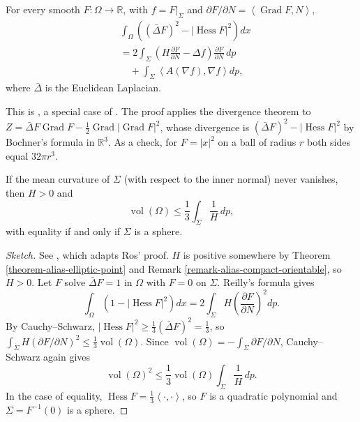 \begin{theorem}
\label{theorem-alias-reilly-formula}
For every smooth
$F:\Omega\to\mathbb{R}$, with
$f=F|_\Sigma$ and
$\partial F/\partial N=\left\langle{}
\operatorname{Grad}F,N\right\rangle{}$,
$$
\begin{aligned}
&\int_\Omega\left((\bar{\Delta}F)^2
-|\operatorname{Hess}F|^2\right)dx\\
&=2\int_\Sigma\left(H
\frac{\partial F}{\partial N}
-\Delta f\right)
\frac{\partial F}{\partial N}\,dp\\
&\quad+\int_\Sigma\left\langle{}
A(\nabla f),\nabla f\right\rangle{}dp,
\end{aligned}
$$
where $\bar{\Delta}$ is the Euclidean
Laplacian.
\end{theorem}

This is \cite[Theorem 4.5,
pp.~35--37]{alias2006analisis}, a special
case of \cite{reilly1977applications}. The
proof applies the divergence theorem to
$Z=\bar{\Delta}F\operatorname{Grad}F
-\frac{1}{2}\operatorname{Grad}
|\operatorname{Grad}F|^2$, whose
divergence is
$(\bar{\Delta}F)^2-|\operatorname{Hess}F|^2$
by Bochner's formula in $\mathbb{R}^3$. As
a check, for $F=|x|^2$ on a ball of radius
$r$ both sides equal $32\pi r^3$.

\begin{theorem}
\label{theorem-alias-heintze-karcher-ros}
If the mean curvature of $\Sigma$ (with
respect to the inner normal) never
vanishes, then $H>0$ and
$$
\operatorname{vol}(\Omega)\leq
\frac{1}{3}\int_\Sigma\frac{1}{H}\,dp,
$$
with equality if and only if $\Sigma$ is a
sphere.
\end{theorem}

\begin{proof}[Sketch]
See \cite[Theorem 4.8,
pp.~40--42]{alias2006analisis}, which
adapts Ros' proof. $H$ is positive
somewhere by Theorem
\ref{theorem-alias-elliptic-point} and
Remark
\ref{remark-alias-compact-orientable}, so
$H>0$. Let $F$ solve $\bar{\Delta}F=1$ in
$\Omega$ with $F=0$ on $\Sigma$. Reilly's
formula gives
$$
\int_\Omega\left(1
-|\operatorname{Hess}F|^2\right)dx
=2\int_\Sigma H\left(
\frac{\partial F}{\partial N}\right)^2dp.
$$
By Cauchy--Schwarz,
$|\operatorname{Hess}F|^2\geq\frac{1}{3}
(\bar{\Delta}F)^2=\frac{1}{3}$, so
$\int_\Sigma H(\partial F/\partial N)^2
\leq\frac{1}{3}\operatorname{vol}(\Omega)$.
Since
$\operatorname{vol}(\Omega)
=-\int_\Sigma\partial F/\partial N$,
Cauchy--Schwarz again gives
$$
\operatorname{vol}(\Omega)^2\leq
\frac{1}{3}\operatorname{vol}(\Omega)
\int_\Sigma\frac{1}{H}\,dp.
$$
In the case of equality,
$\operatorname{Hess}F=\frac{1}{3}
\left\langle{} \cdot,\cdot
\right\rangle{}$, so $F$ is a quadratic
polynomial and $\Sigma=F^{-1}(0)$ is a
sphere.
\end{proof}

